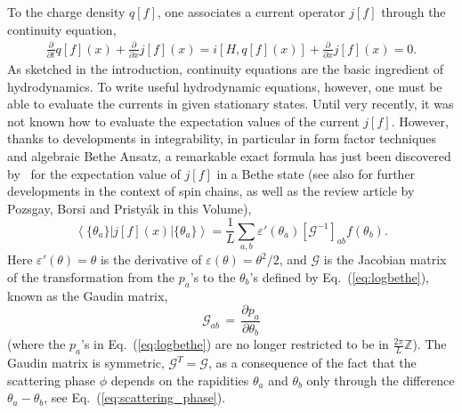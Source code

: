 \documentclass[onecolumn,amsfonts,showpacs,superscriptaddress]{revtex4-1}
\begin{document}
To the charge density $q[f]$, one associates a current operator $j[f]$ through the continuity equation,
\begin{eqnarray}
    \label{eq:jfx}
    \frac{\partial}{\partial t}  q[f](x) + \frac{\partial}{\partial x} j[f](x) = i \left[ H, q[f](x) \right]  + \frac{\partial}{\partial x} j[f](x) = 0.
\end{eqnarray}
As sketched in the introduction, continuity equations are the basic ingredient of hydrodynamics. To write useful hydrodynamic equations, however, one must be able to evaluate the currents in given stationary states. Until very recently, it was not known how to evaluate the expectation values of the current $j[f]$. However, thanks to developments in integrability, in particular in form factor techniques and algebraic Bethe Ansatz, a remarkable exact formula has just  been discovered by~\cite{borsi2020current} for the expectation value of $j [f]$ in a Bethe state (see also \citep{pozsgay2020algebraic,pozsgay2020current} for further developments in the context of spin chains, as well as the review article by Pozsgay, Borsi and Pristy\'ak in this Volume),
\begin{equation}
    \label{eq:pozsgay}
 \left< \{ \theta_a \} \right|  j [f](x)  \left| \{ \theta_a \} \right> = \frac{1}{L} \sum_{a,b} \varepsilon' (\theta_a)  [\mathcal{G}^{-1}]_{ab}  f (\theta_b) .
\end{equation}
Here $\varepsilon' (\theta) = \theta$ is the derivative of $\varepsilon (\theta) = \theta^2/2$, and $\mathcal{G}$ is the Jacobian matrix of the transformation from the $p_a$'s to the $\theta_b$'s defined by Eq.~(\ref{eq:logbethe}), known as the Gaudin matrix,
\begin{equation}
	\label{eq:gaudin}
	\mathcal{G}_{ab} \, = \, \frac{\partial p_a}{\partial \theta_b} 
\end{equation}
(where the $p_a$'s in Eq.~(\ref{eq:logbethe}) are no longer restricted to be in $\frac{2\pi}{L} \mathbb{Z}$). 
The Gaudin matrix is symmetric, $\mathcal{G}^T = \mathcal{G}$, as a consequence of the fact that the scattering phase $\phi$ depends on the rapidities $\theta_a$ and $\theta_b$ only through the difference $\theta_a-\theta_b$, see Eq.~(\ref{eq:scattering_phase}).
\end{document}
